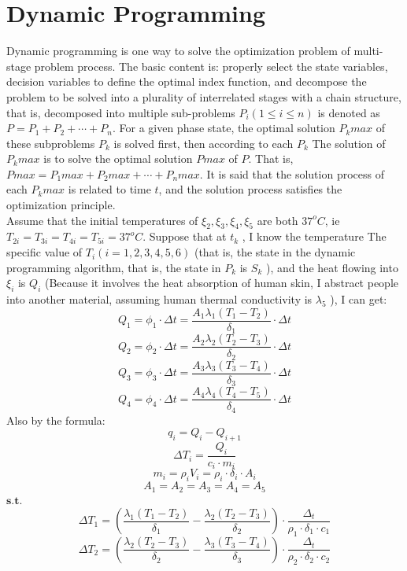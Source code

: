 \documentclass[12pt]{ctexart}
\begin{document}
\section{Dynamic Programming}
\indent Dynamic programming is one way to solve the optimization problem of multi-stage problem process. The basic content is: properly select the state variables, decision variables to define the optimal index function, and decompose the problem to be solved into a plurality of interrelated stages with a chain structure, that is, decomposed into multiple sub-problems $P_i (1 \leq i \leq n)$ is denoted as $P = P_1 + P_2 + \cdots + P_n$. For a given phase state, the optimal solution $P_k max$ of these subproblems $P_k$ is solved first, then according to each $P_{k}$ The solution of $P_{k}max$ is to solve the optimal solution $Pmax$ of $P$. That is, $Pmax = P_1 max + P_2 max + \cdots + P_n max$\cite{sakoe1978dynamic}.
It is said that the solution process of each $P_k max$ is related to time $t$, and the solution process satisfies the optimization principle\cite{bertsekas2005dynamic}.\\
\indent Assume that the initial temperatures of $\xi_2 , \xi_3 , \xi_4 , \xi_5$ are both $37^{o}C$, ie $T_{2i} = T_{3i} = T_{4i} = T_{5i} = 37^{o}C$. Suppose that at $t_k$ , I know the temperature
The specific value of $T_i (i = 1, 2, 3, 4, 5, 6)$ (that is, the state in the dynamic programming algorithm, that is, the state in $P_k$ is $S_k$ ), and the heat flowing into $\xi_i$ is $Q_i$ (Because it involves the heat absorption of human skin, I abstract people into another material, assuming human thermal conductivity is $\lambda_5$ ), I can get:
\[Q_{1} = \phi_{1}\cdot \Delta t = \frac{A_{1}\lambda_{1}(T_1-T_2)}{\delta_{1}}\cdot \Delta t\]
\[Q_{2} = \phi_{2}\cdot \Delta t = \frac{A_{2}\lambda_{2}(T_2-T_3)}{\delta_{2}}\cdot \Delta t\]
\[Q_{3} = \phi_{3}\cdot \Delta t = \frac{A_{3}\lambda_{3}(T_3-T_4)}{\delta_{3}}\cdot \Delta t\]
\[Q_{4} = \phi_{4}\cdot \Delta t = \frac{A_{4}\lambda_{4}(T_4-T_5)}{\delta_{4}}\cdot \Delta t\]
\indent Also by the formula\cite{callen1998thermodynamics}:
\[q_{i} = Q_{i} - Q_{i+1}\]
\[\Delta T_{i} = \frac{Q_{i}}{c_{i}\cdot m_{i}}\]
\[m_{i} = \rho_{i}V_{i} = \rho_{i}\cdot \delta_{i}\cdot A_{i}\]
\[A_{1} = A_{2} = A_{3} = A_{4} = A_{5}\]
\indent$\textbf{s.t.}$
\[\Delta T_{1} = (\frac{\lambda_{1}(T_{1}-T_{2})}{\delta_{1}} - \frac{\lambda_{2}(T_{2}-T_{3})}{\delta_{2}})\cdot\frac{\Delta_{t}}{\rho_{1}\cdot\delta_{1}\cdot c_{1}}\]
\[\Delta T_{2} = (\frac{\lambda_{2}(T_{2}-T_{3})}{\delta_{2}} - \frac{\lambda_{3}(T_{3}-T_{4})}{\delta_{3}})\cdot\frac{\Delta_{t}}{\rho_{2}\cdot\delta_{2}\cdot c_{2}}\]
\end{document}
